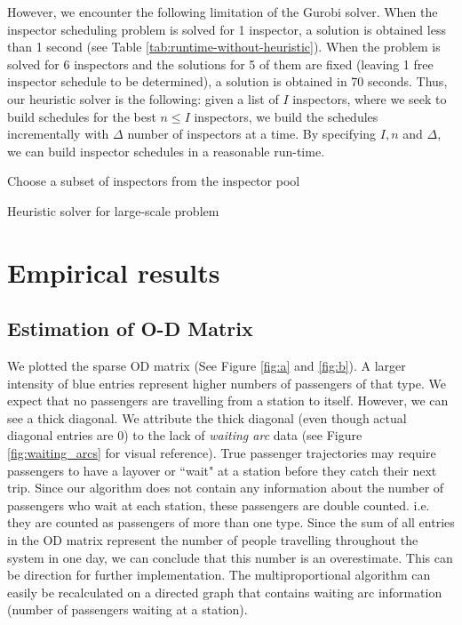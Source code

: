 \documentclass[11pt]{article}
\begin{document}
However, we encounter the following limitation of the Gurobi solver. When the inspector scheduling problem is solved for 1 inspector, a solution is obtained less than 1 second (see Table \ref{tab:runtime-without-heuristic}). When the problem is solved for 6 inspectors and the solutions for 5 of them are fixed (leaving 1 free inspector schedule to be determined), a solution is obtained in 70 seconds. Thus, our heuristic solver is the following: given a list of $I$ inspectors, where we seek to build schedules for the best $n\le I$ inspectors, we build the schedules incrementally with $\Delta$ number of inspectors at a time. By specifying $I, n$ and $\Delta$, we can build inspector schedules in a reasonable run-time. 


\begin{algorithm}[t]
    \DontPrintSemicolon
    Choose a subset of inspectors from the inspector pool\;
    \caption{Heuristic solver for large-scale problem}
    \label{algor:heuristic-solver}
\end{algorithm}

\section{Empirical results}

\subsection{Estimation of O-D Matrix}
\par We plotted the sparse OD matrix (See Figure \ref{fig:a} and \ref{fig:b}). A larger intensity of blue entries represent higher numbers of passengers of that type. We expect that no passengers are travelling from a station to itself. However, we can see a thick diagonal. We attribute the thick diagonal (even though actual diagonal entries are $0$) to the lack of \textit{waiting arc} data (see Figure \ref{fig:waiting_arcs} for visual reference). True passenger trajectories may require passengers to have a layover or ``wait" at a station before they catch their next trip. Since our algorithm does not contain any information about the number of passengers who wait at each station, these passengers are double counted. i.e. they are counted as passengers of more than one type. Since the sum of all entries in the OD matrix represent the number of people travelling throughout the system in one day, we can conclude that this number is an overestimate. This can be direction for further implementation. The multiproportional algorithm can easily be recalculated on a directed graph that contains waiting arc information (number of passengers waiting at a station).
\end{document}
